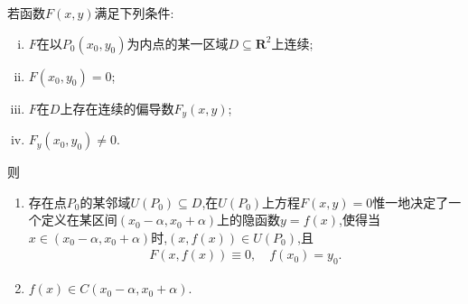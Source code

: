 \documentclass[../../main.tex]{subfiles}%
\begin{document}
\begin{theorem}[隐函数存在唯一性定理]\label{theorem:隐函数存在唯一性定理}
若函数$F(x,y)$满足下列条件:
\begin{enumerate}[(i)]
\item $F$在以$P_0(x_0,y_0)$为内点的某一区域$D \subseteq \mathbf{R}^2$上连续;
\item $F(x_0,y_0) = 0$;
\item $F$在$D$上存在连续的偏导数$F_y(x,y)$;
\item $F_y(x_0,y_0) \neq 0$.
\end{enumerate}
则
\begin{enumerate}[(1)]
\item 存在点$P_0$的某邻域$U(P_0) \subseteq D$,在$U(P_0)$上方程$F(x,y) = 0$惟一地决定了一个定义在某区间$(x_0-\alpha,x_0+\alpha)$上的隐函数$y = f(x)$,使得当$x \in (x_0-\alpha,x_0+\alpha)$时,$(x,f(x)) \in U(P_0)$,且
\begin{align*}
F(x,f(x)) \equiv 0,\quad f(x_0) = y_0.
\end{align*}

\item $f(x)\in C(x_0-\alpha,x_0+\alpha)$.
\end{enumerate}
\end{theorem}
\end{document}
